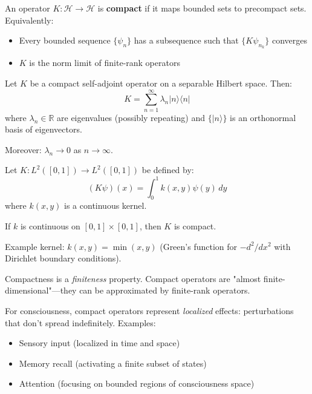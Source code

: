\begin{definition}\label{def:compact-operator}
An operator $K: \mathcal{H} \to \mathcal{H}$ is \textbf{compact}\cite{reed1980,rudin1976} if it maps bounded sets to precompact sets. Equivalently:
\begin{itemize}
\item Every bounded sequence $\{\psi_n\}$ has a subsequence such that $\{K\psi_{n_k}\}$ converges
\item $K$ is the norm limit of finite-rank operators
\end{itemize}
\end{definition}

\begin{theorem}\label{thm:spectral-theorem-compact}
Let $K$ be a compact self-adjoint operator on a separable Hilbert space. Then:
\begin{equation}
K = \sum_{n=1}^\infty \lambda_n |n\rangle\langle n|
\end{equation}
where $\lambda_n \in \mathbb{R}$ are eigenvalues (possibly repeating) and $\{|n\rangle\}$ is an orthonormal basis of eigenvectors.

Moreover: $\lambda_n \to 0$ as $n \to \infty$.
\end{theorem}

\begin{example}\label{ex:integral-operators-compact}
Let $K: L^2([0,1]) \to L^2([0,1])$ be defined by:
\begin{equation}
(K\psi)(x) = \int_0^1 k(x, y) \psi(y) \, dy
\end{equation}
where $k(x,y)$ is a continuous kernel.

If $k$ is continuous on $[0,1] \times [0,1]$, then $K$ is compact.

Example kernel: $k(x,y) = \min(x,y)$ (Green's function for $-d^2/dx^2$ with Dirichlet boundary conditions).
\end{example}

\begin{keyidea}
Compactness is a \textit{finiteness} property. Compact operators are "almost finite-dimensional"---they can be approximated by finite-rank operators.

For consciousness, compact operators represent \textit{localized} effects: perturbations that don't spread indefinitely. Examples:
\begin{itemize}
\item Sensory input (localized in time and space)
\item Memory recall (activating a finite subset of states)
\item Attention (focusing on bounded regions of consciousness space)
\end{itemize}
\end{keyidea}

